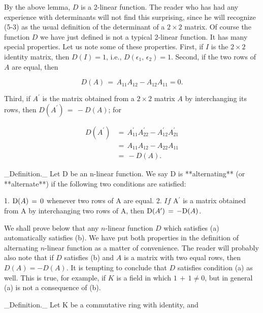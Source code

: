 By the above lemma, \(D\) is a 2-linear function. The reader who has had any experience with determinants will not find this surprising, since he will recognize (5-3) as the usual definition of the determinant of a \(2\times 2\) matrix. Of course the function \(D\) we have just defined is not a typical 2-linear function. It has many special properties. Let us note some of these properties. First, if \(I\) is the \(2\times 2\) identity matrix, then \(D(I)=1\), i.e., \(D(\epsilon_{1},\,\epsilon_{2})=1\). Second, if the two rows of \(A\) are equal, then

\[D(A)\,=\,A_{11}A_{12}-A_{12}A_{11}=0.\]

Third, if \(A^{\prime}\) is the matrix obtained from a \(2\times 2\) matrix \(A\) by interchanging its rows, then \(D(A^{\prime})\,=\,-D(A)\); for

\[\begin{array}{ll}D(A^{\prime})&=\,A^{\prime}_{11}A^{\prime}_{22}-A^{\prime} _{12}A^{\prime}_{21}\\ &=\,A_{11}A_{12}-A_{22}A_{11}\\ &=\,-D(A).\end{array}\]

_Definition._ Let D be an n-linear function. We say D is **alternating** (or **alternate**) if the following two conditions are satisfied:

1. \(\mbox{\rm D}(A)\,=\,0\) whenever two rows of A are equal.
2. \(If\) A\({}^{\prime}\) is a matrix obtained from A by interchanging two rows of A, then \(\mbox{\rm D}(A^{\prime})\,=\,-\mbox{\rm D}(A)\).

We shall prove below that any \(n\)-linear function \(D\) which satisfies (a) automatically satisfies (b). We have put both properties in the definition of alternating \(n\)-linear function as a matter of convenience. The reader will probably also note that if \(D\) satisfies (b) and \(A\) is a matrix with two equal rows, then \(D(A)=-D(A)\). It is tempting to conclude that \(D\) satisfies condition (a) as well. This is true, for example, if \(K\) is a field in which \(1\,+\,1\neq 0\), but in general (a) is not a consequence of (b).

_Definition._ Let K be a commutative ring with identity, and 